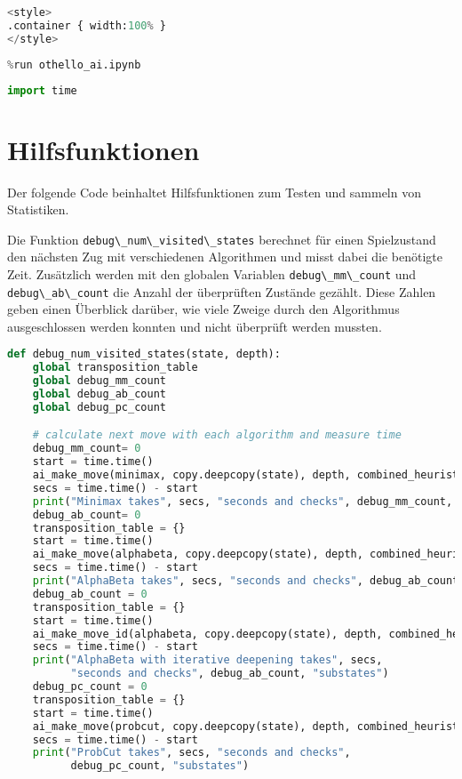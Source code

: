\begin{lstlisting}[language=Python]
%%HTML
<style>
.container { width:100% }
</style>
\end{lstlisting}

\begin{lstlisting}[language=Python]
%run othello_game.ipynb
%run othello_ai.ipynb
\end{lstlisting}

\begin{lstlisting}[language=Python]
import time
\end{lstlisting}

\hypertarget{hilfsfunktionen}{%
\section{Hilfsfunktionen}\label{hilfsfunktionen}}

Der folgende Code beinhaltet Hilfsfunktionen zum Testen und sammeln von
Statistiken.

Die Funktion \passthrough{\lstinline!debug\_num\_visited\_states!}
berechnet für einen Spielzustand den nächsten Zug mit verschiedenen
Algorithmen und misst dabei die benötigte Zeit. Zusätzlich werden mit
den globalen Variablen \passthrough{\lstinline!debug\_mm\_count!} und
\passthrough{\lstinline!debug\_ab\_count!} die Anzahl der überprüften
Zustände gezählt. Diese Zahlen geben einen Überblick darüber, wie viele
Zweige durch den Algorithmus ausgeschlossen werden konnten und nicht
überprüft werden mussten.

\begin{lstlisting}[language=Python]
def debug_num_visited_states(state, depth):
    global transposition_table
    global debug_mm_count
    global debug_ab_count
    global debug_pc_count

    # calculate next move with each algorithm and measure time
    debug_mm_count= 0
    start = time.time()
    ai_make_move(minimax, copy.deepcopy(state), depth, combined_heuristic)
    secs = time.time() - start
    print("Minimax takes", secs, "seconds and checks", debug_mm_count, "substates")
    debug_ab_count= 0
    transposition_table = {}
    start = time.time()
    ai_make_move(alphabeta, copy.deepcopy(state), depth, combined_heuristic)
    secs = time.time() - start
    print("AlphaBeta takes", secs, "seconds and checks", debug_ab_count, "substates")
    debug_ab_count = 0
    transposition_table = {}
    start = time.time()
    ai_make_move_id(alphabeta, copy.deepcopy(state), depth, combined_heuristic)
    secs = time.time() - start
    print("AlphaBeta with iterative deepening takes", secs,
          "seconds and checks", debug_ab_count, "substates")
    debug_pc_count = 0
    transposition_table = {}
    start = time.time()
    ai_make_move(probcut, copy.deepcopy(state), depth, combined_heuristic)
    secs = time.time() - start
    print("ProbCut takes", secs, "seconds and checks",
          debug_pc_count, "substates")
\end{lstlisting}


